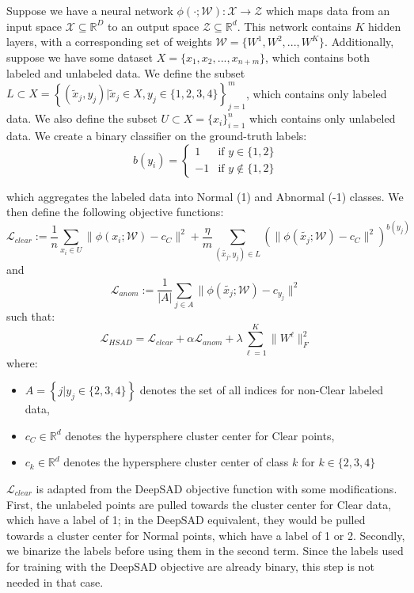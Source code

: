 \documentclass[remotesensing,article,submit,moreauthors]{Definitions/mdpi}
\begin{document}
Suppose we have a neural network $\phi(\cdot;\mathcal{W}): \mathcal{X} \rightarrow \mathcal{Z}$ which maps data from an input space $\mathcal{X} \subseteq \mathbb{R}^D$ to an output space $\mathcal{Z} \subseteq \mathbb{R}^d$. This network contains $K$ hidden layers, with a corresponding set of weights $\mathcal{W} = \{W^1, W^2, ..., W^K\}$. Additionally, suppose we have some dataset $X = \{x_1, x_2, ..., x_{n+m}\}$, which contains both labeled and unlabeled data. We define the subset $L \subset X = \left\{(\tilde{x}_j, y_j) | \tilde{x}_j \in X, y_j \in \{1, 2,3, 4\}\right\}_{j=1}^{m}$, which contains only labeled data. We also define the subset $U \subset X = \{x_i\}_{i=1}^{n}$ which contains only unlabeled data. We create a binary classifier on the ground-truth labels:
\[b(y_i) = \begin{cases}
    1 & \text{if } y \in \{1,2\} \\
    -1 & \text{if } y \notin \{1,2\}
\end{cases}\]

which aggregates the labeled data into Normal (1) and Abnormal (-1) classes. We then define the following objective functions:
\[\mathcal{L}_{clear} := \frac{1}{n}\sum_{x_i \in U}{\|\phi(x_i;\mathcal{W}) - c_C\|^2} + \frac{\eta}{m}\sum_{(\tilde{x_j}, y_j) \in L}{(\|\phi(\tilde{x_j};\mathcal{W}) - c_C\|^{2})^{b(y_j)}}\]
and
\[\mathcal{L}_{anom} := \frac{1}{|A|}\sum_{j \in A}{\|\phi(\tilde{x_j};\mathcal{W}) - c_{y_j}\|^2}\]
such that:
\[\mathcal{L}_{HSAD} = \mathcal{L}_{clear} + \alpha\mathcal{L}_{anom} + \lambda\sum_{\ell = 1}^{K}{\|W^{\ell}\|^2_F}\]
where:
\begin{itemize}
\item $A = \left\{j | y_j \in \{2,3,4\}\right\}$ denotes the set of all indices for non-Clear labeled data,
\item $c_C \in \mathbb{R}^d$ denotes the hypersphere cluster center for Clear points,
\item $c_k \in \mathbb{R}^d$ denotes the hypersphere cluster center of class $k$ for $k \in \{2,3,4\}$
\end{itemize}

$\mathcal{L}_{clear}$ is adapted from the \ac{DeepSAD} objective function with some modifications. First, the unlabeled points are pulled towards the cluster center for Clear data, which have a label of 1; in the \ac{DeepSAD} equivalent, they would be pulled towards a cluster center for Normal points, which have a label of 1 or 2. Secondly, we binarize the labels before using them in the second term. Since the labels used for training with the \ac{DeepSAD} objective are already binary, this step is not needed in that case. 
\end{document}
